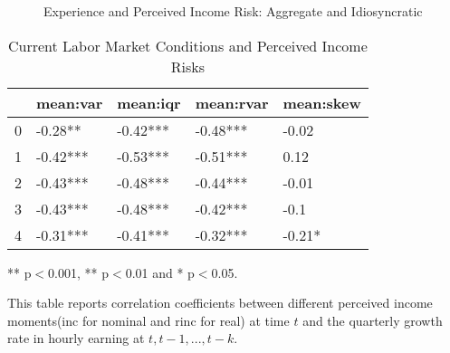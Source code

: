 \clearpage

\begin{figure}[!ht]
	\caption{Experience and Perceived Income Risk: Aggregate and Idiosyncratic}
	\label{fig:experience_id_ag_data}
	\begin{center} 
\end{center}
\end{figure}
   
\clearpage

\begin{table}[ht]
\centering
\begin{adjustbox}{width={\textwidth}}
\begin{threeparttable}
\caption{Current Labor Market Conditions and Perceived Income Risks}
\label{macro_corr_he}
\begin{tabular}{lllll}
\toprule
{} &  mean:var &  mean:iqr & mean:rvar & mean:skew \\
\midrule
0 &   -0.28** &  -0.42*** &  -0.48*** &     -0.02 \\
1 &  -0.42*** &  -0.53*** &  -0.51*** &      0.12 \\
2 &  -0.43*** &  -0.48*** &  -0.44*** &     -0.01 \\
3 &  -0.43*** &  -0.48*** &  -0.42*** &      -0.1 \\
4 &  -0.31*** &  -0.41*** &  -0.32*** &    -0.21* \\
\bottomrule
\end{tabular}
\begin{tablenotes}
\item *** p$<$0.001, ** p$<$0.01 and * p$<$0.05.
\item This table reports correlation coefficients between different perceived income moments(inc for nominal
and rinc for real) at time
$t$ and the quarterly growth rate in hourly earning at $t,t-1,...,t-k$.
\end{tablenotes}
\end{threeparttable}
\end{adjustbox}
\end{table}
\clearpage

